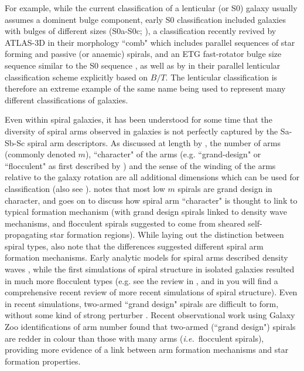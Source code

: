 \documentclass[usenatbib]{mn2e}
\newcommand{\ie}{{\it i.e.}}
\begin{document}
 For example, while the current classification of a lenticular (or S0) galaxy usually assumes a dominent bulge component, early S0 classification included galaxies with bulges of different sizes (S0a-S0c; \citealt{SpitzerBaade1951, vandenBergh1976}), a classification recently revived by ATLAS-3D in their morphology ``comb" which includes parallel sequences of star forming and passive (or anaemic) spirals, and an ETG fast-rotator bulge size sequence similar to the S0 sequence \citep{2011MNRAS.416.1680C}, as well as by \citet{Kormendy2012} in their parallel lenticular classification scheme explicitly based on $B/T$. The lenticular classification is therefore an extreme example of the same name being used to represent many different classifications of galaxies. 

 Even within spiral galaxies, it has been understood for some time that the diversity of spiral arms observed in galaxies is not perfectly captured by the Sa-Sb-Sc spiral arm descriptors. As discussed at length by \citet{Buta2013}, the number of arms (commonly denoted $m$), ``character" of the arms (e.g. ``grand-design" or ``flocculent" as first described by \citealt{Elmegreen1981}) and the sense of the winding of the arms relative to the galaxy rotation are all additional dimensions which can be used for classification (also see \citealt{1987ApJ...314....3E,AnnLee2013}). \citet{Buta2013} notes that most low $m$ spirals are grand design in character, and goes on to discuss how spiral arm ``character" is thought to link to typical formation mechanism (with grand design spirals linked to density wave mechanisms, and flocculent spirals suggested to come from sheared self-propagating star formation regions). While laying out the distinction between spiral types, \citet{Elmegreen1981} also note that the differences suggested different spiral arm formation mechanisms. Early analytic models for spiral arms described density waves \citep{LinShu1964}, while the first simulations of spiral structure in isolated galaxies resulted in much more flocculent types (e.g. see the review in \citealt{Elmegreen1981}, and in  \citet{DobbsBaba2014} you will find a comprehensive recent review of more recent simulations of spiral structure). Even in recent simulations, two-armed ``grand design" spirals are difficult to form, without some kind of strong perturber \citep{Sellwood2011}. Recent observational work using Galaxy Zoo identifications of arm number \citep{Hart2016,Hart2017a} found that two-armed (``grand design") spirals are redder in colour than those with many arms (\ie ~flocculent spirals), providing more evidence of a link between arm formation mechanisms and star formation properties.  
\end{document}
